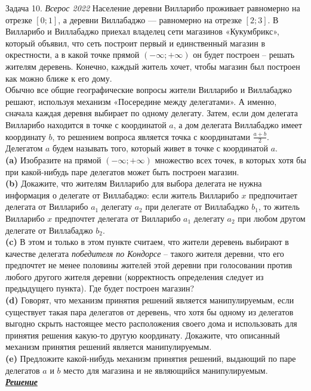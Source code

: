 \begin{mybox}{Задача 10. \textit{Всерос 2022}}
    \indent\setlength{\parindent}{1em}\indent\setlength{\parindent}{1em}Население деревни Вилларибо проживает равномерно
    на отрезке $[0; 1]$, а деревни Виллабаджо –– равномерно на отрезке $[2; 3]$. В Вилларибо и Виллабаджо приехал
    владелец сети магазинов «Кукумбрикс», который объявил, что сеть построит первый и единственный магазин в
    окрестности, а в какой точке прямой $(-\infty; +\infty)$ он будет построен –
    решать жителям деревень. Конечно, каждый житель хочет, чтобы магазин был построен как можно ближе к его дому.\\
    \indent\setlength{\parindent}{1em}Обычно все общие географические вопросы жители Вилларибо и Виллабаджо решают,
    используя механизм «Посередине между делегатами». А именно, сначала каждая деревня выбирает по одному делегату.
    Затем, если дом делегата Вилларибо находится в точке с координатой $a$, а дом делегата Виллабаджо имеет
    координату $b$, то решением вопроса является точка с координатами $\frac{a+b}{2}$. Делегатом $a$ будем называть
    того, который живет в точке с координатой $a$.\smallskip\\
    \indent\setlength{\parindent}{1em}\textbf{(a)} Изобразите на прямой $(-\infty; +\infty)$ множество всех точек, в
    которых хотя бы при какой-нибудь паре делегатов может быть построен магазин.\smallskip\\
    \indent\setlength{\parindent}{1em}\textbf{(b)} Докажите, что жителям Вилларибо для выбора делегата не нужна
    информация о делегате от Виллабаджо: если житель Вилларибо $x$ предпочитает делегата от Вилларибо $a_1$ делегату
    $a_2$ при делегате от Виллабаджо $b_1$, то житель Вилларибо $x$ предпочтет делегата от Вилларибо $a_1$ делегату $
    a_2$ при любом другом делегате от Виллабаджо $b_2$.\smallskip\\
    \indent\setlength{\parindent}{1em}\textbf{(c)} В этом и только в этом пункте считаем, что жители деревень выбирают
    в качестве делегата \textit{победителя по Кондорсе} – такого жителя деревни, что его предпочтет не менее половины
    жителей этой деревни при голосовании против любого другого жителя деревни (корректность определения следует из
    предыдущего пункта). Где будет построен магазин?\smallskip\\
    \indent\setlength{\parindent}{1em}\textbf{(d)} Говорят, что механизм принятия решений является манипулируемым,
    если существует такая пара делегатов от деревень, что хотя бы одному из делегатов выгодно скрыть настоящее место
    расположения своего дома и использовать для принятия решения какую-то другую координату. Докажите, что описанный
    механизм принятия решений является манипулируемым.\smallskip\\
    \indent\setlength{\parindent}{1em}\textbf{(e)} Предложите какой-нибудь механизм принятия решений, выдающий по паре
    делегатов $a$ и $b$ место для магазина и не являющийся манипулируемым.\bigskip\\
    \textit{\textbf{\centering\href{https://iloveeconomics.ru/sites/default/files/olimp/vseros/2022/vseros_2022_solutions_10_23379.pdf}{Решение}}}
\end{mybox}

